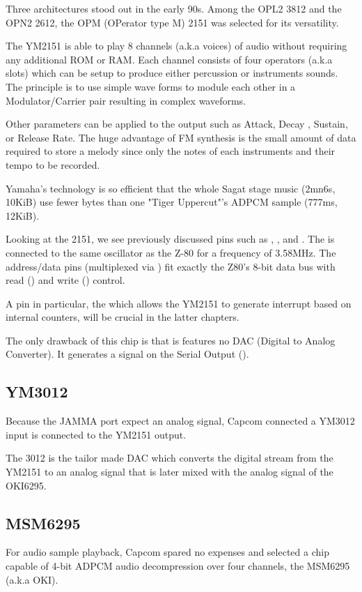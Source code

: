 Three architectures stood out in the early 90s. Among the OPL2 3812 and the OPN2 2612, the OPM (OPerator type M) 2151 was selected for its versatility. 

The YM2151 is able to play 8 channels (a.k.a voices) of audio without requiring any additional ROM or RAM. Each channel consists of four operators (a.k.a slots) which can be setup to produce either percussion or instruments sounds. The principle is to use simple wave forms to module each other in a Modulator/Carrier pair resulting in complex waveforms\cite{fmProgramming}.


Other parameters can be applied to the output such as Attack, Decay , Sustain, or Release Rate. The huge advantage of FM synthesis is the small amount of data required to store a melody since only the notes of each instruments and their tempo to be recorded. 

Yamaha's technology is so efficient that the whole Sagat stage music (2mn6s, 10KiB) use fewer bytes than one "Tiger Uppercut"'s ADPCM sample (777ms, 12KiB).

Looking at the 2151, we see previously discussed pins such as , , and . The  is connected to the same oscillator as the Z-80 for a frequency of 3.58MHz. The  address/data pins (multiplexed via ) fit exactly the Z80's 8-bit data bus with read () and write () control.

A pin in particular, the  which allows the YM2151 to generate interrupt based on internal counters, will be crucial in the latter chapters.


The only drawback of this chip is that is features no DAC (Digital to Analog Converter). It generates a signal on the Serial Output (). 

\subsection{YM3012}
Because the JAMMA port expect an analog signal, Capcom connected a YM3012 input is connected to the YM2151 output. 

The 3012 is the tailor made DAC which converts the digital stream from the YM2151 to an analog signal that is later mixed with the analog signal of the OKI6295.

\subsection{MSM6295}
For audio sample playback, Capcom spared no expenses and selected a chip capable of 4-bit ADPCM audio decompression over four channels, the MSM6295 (a.k.a OKI). 

